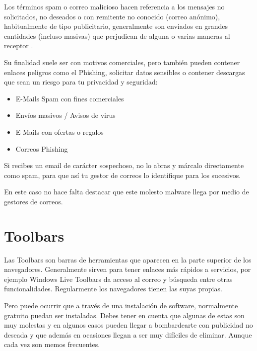 \documentclass[
  spanish,
  a4paper,
  openany]{book}
\begin{document}
Los términos spam o correo malicioso hacen referencia a los mensajes no solicitados, no deseados o con remitente no conocido (correo anónimo), habitualmente de tipo publicitario, generalmente son enviados en grandes cantidades (incluso masivas) que perjudican de alguna o varias maneras al receptor \citep{WIKI-spam}.

Su finalidad suele ser con motivos comerciales, pero también pueden contener enlaces peligros como el Phishing, solicitar datos sensibles o contener descargas que sean un riesgo para tu privacidad y seguridad:

\begin{itemize}
\item
  E-Mails Spam con fines comerciales
\item
  Envíos masivos / Avisos de virus
\item
  E-Mails con ofertas o regalos
\item
  Correos Phishing
\end{itemize}

Si recibes un email de carácter sospechoso, no lo abras y márcalo directamente como spam, para que así tu gestor de correos lo identifique para los sucesivos.

En este caso no hace falta destacar que este molesto malware llega por medio de gestores de correos.

\hypertarget{toolbars}{%
\section{Toolbars}\label{toolbars}}

Las Toolbars son barras de herramientas que aparecen en la parte superior de los navegadores. Generalmente sirven para tener enlaces más rápidos a servicios, por ejemplo Windows Live Toolbars da acceso al correo y búsqueda entre otras funcionalidades. Regularmente los navegadores tienen las suyas propias.

Pero puede ocurrir que a través de una instalación de software, normalmente gratuito puedan ser instaladas. Debes tener en cuenta que algunas de estas son muy molestas y en algunos casos pueden llegar a bombardearte con publicidad no deseada y que además en ocasiones llegan a ser muy difíciles de eliminar. Aunque cada vez son memos frecuentes.
\end{document}
